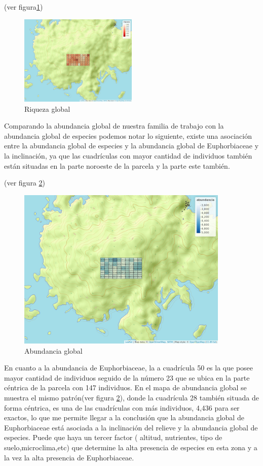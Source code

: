 \documentclass[11pt,]{article}
\begin{document}
(ver figura\ref{fig:cuadro_riqueza_global})

\begin{figure}
\centering
\includegraphics[width=0.50000\textwidth]{mapa_cuadros_riq_global.png}
\caption{\label{fig:cuadro_riqueza_global}Riqueza global}
\end{figure}

Comparando la abundancia global de nuestra familia de trabajo con la
abundancia global de especies podemos notar lo siguiente, existe una
asociación entre la abundancia global de especies y la abundancia global
de Euphorbiaceae y la inclinación, ya que las cuadrículas con mayor
cantidad de individuos también están situadas en la parte noroeste de la
parcela y la parte este también.

(ver figura \ref{fig:cuadro_de_abundancia_global})

\begin{figure}
\centering
\includegraphics[width=0.90000\textwidth]{mapa_cuadros_abun_global.png}
\caption{\label{fig:cuadro_de_abundancia_global}Abundancia global}
\end{figure}

En cuanto a la abundancia de Euphorbiaceae, la a cuadrícula 50 es la que
posee mayor cantidad de individuos seguido de la número 23 que se ubica
en la parte céntrica de la parcela con 147 individuos. En el mapa de
abundancia global se muestra el mismo patrón(ver figura
\ref{fig:cuadro_de_abundancia_global}), donde la cuadrícula 28 también
situada de forma céntrica, es una de las cuadrículas con más individuos,
4,436 para ser exactos, lo que me permite llegar a la conclusión que la
abundancia global de Euphorbiaceae está asociada a la inclinación del
relieve y la abundancia global de especies. Puede que haya un tercer
factor ( altitud, nutrientes, tipo de suelo,microclima,etc) que
determine la alta presencia de especies en esta zona y a la vez la alta
presencia de Euphorbiaceae.
\end{document}
